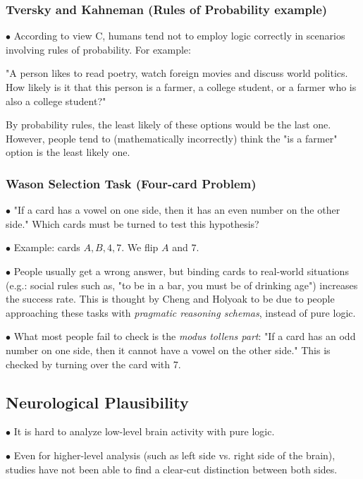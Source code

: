 \documentclass[english,openany]{book}
\begin{document}
\subsubsection{Tversky and Kahneman (Rules of Probability example)}

$\bullet$ According to view C, humans tend not to employ logic correctly in scenarios involving rules of probability. For example:

"A person likes to read poetry, watch foreign movies and discuss world politics. How likely is it that this person is a farmer, a college student, or a farmer who is also a college student?"

By probability rules, the least likely of these options would be the last one. However, people tend to (mathematically incorrectly) think the "is a farmer" option is the least likely one.

\subsubsection{Wason Selection Task (Four-card Problem)}

$\bullet$ "If a card has a vowel on one side, then it has an even number on the other side." Which cards must be turned to test this hypothesis?

$\bullet$ Example: cards $A, B, 4, 7$. We flip $A$ and $7$.

$\bullet$ People usually get a wrong answer, but binding cards to real-world situations (e.g.: social rules such as, "to be in a bar, you must be of drinking age") increases the success rate. This is thought by Cheng and Holyoak to be due to people approaching these tasks with \textit{pragmatic reasoning schemas}, instead of pure logic.

$\bullet$ What most people fail to check is the \textit{modus tollens part}: "If a card has an odd number on one side, then it cannot have a vowel on the other side." This is checked by turning over the card with 7.

\subsection{Neurological Plausibility}

$\bullet$ It is hard to analyze low-level brain activity with pure logic.

$\bullet$ Even for higher-level analysis (such as left side vs. right side of the brain), studies have not been able to find a clear-cut distinction between both sides.
\end{document}
